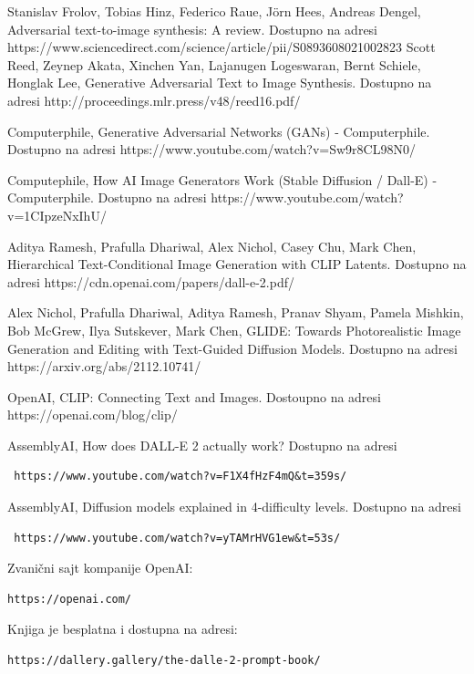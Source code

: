 \documentclass[12pt, letterpaper]{article}
\begin{document}
\pagebreak
\begin{thebibliography}{10}

 Stanislav Frolov, Tobias Hinz, Federico Raue, Jörn Hees, Andreas Dengel, Adversarial text-to-image synthesis: A review. Dostupno na adresi https://www.sciencedirect.com/science/article/pii/S0893608021002823
 Scott Reed, Zeynep Akata, Xinchen Yan, Lajanugen Logeswaran, Bernt Schiele, Honglak Lee, Generative Adversarial Text to Image Synthesis. Dostupno na adresi http://proceedings.mlr.press/v48/reed16.pdf/

 Computerphile, Generative Adversarial Networks (GANs) - Computerphile. Dostupno na adresi https://www.youtube.com/watch?v=Sw9r8CL98N0/

 Computephile, How AI Image Generators Work (Stable Diffusion / Dall-E) - Computerphile. Dostupno na adresi https://www.youtube.com/watch?v=1CIpzeNxIhU/

 Aditya Ramesh, Prafulla Dhariwal, Alex Nichol, Casey Chu, Mark Chen, Hierarchical Text-Conditional
Image Generation with CLIP Latents. Dostupno na adresi https://cdn.openai.com/papers/dall-e-2.pdf/

 Alex Nichol, Prafulla Dhariwal, Aditya Ramesh, Pranav Shyam, Pamela Mishkin, Bob McGrew, Ilya Sutskever, Mark Chen, GLIDE: Towards Photorealistic Image Generation and Editing with Text-Guided Diffusion Models. Dostupno na adresi https://arxiv.org/abs/2112.10741/

 OpenAI, CLIP: Connecting
Text and Images. Dostoupno na adresi https://openai.com/blog/clip/

 AssemblyAI, How does DALL-E 2 actually work? Dostupno na adresi\begin{verbatim} https://www.youtube.com/watch?v=F1X4fHzF4mQ&t=359s/

\end{verbatim}

 AssemblyAI, Diffusion models explained in 4-difficulty levels. Dostupno na adresi\begin{verbatim} https://www.youtube.com/watch?v=yTAMrHVG1ew&t=53s/
\end{verbatim}

Zvanični sajt kompanije OpenAI:\begin{verbatim}https://openai.com/\end{verbatim}

Knjiga je besplatna i dostupna na adresi:\begin{verbatim}https://dallery.gallery/the-dalle-2-prompt-book/\end{verbatim}


\end{thebibliography}
\end{document}
